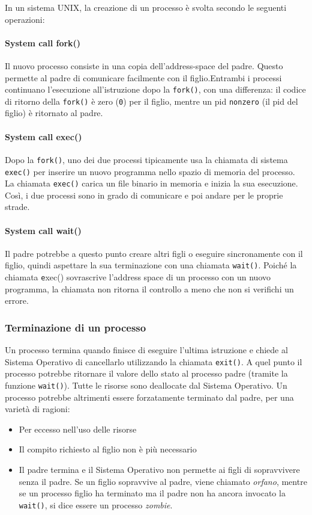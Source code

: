 \documentclass[a4paper]{article}
\begin{document}
In un sistema UNIX, la creazione di un processo è svolta secondo le seguenti operazioni:

\paragraph{System call fork()} Il nuovo processo consiste in una copia dell'address-space del padre. Questo permette al padre di comunicare facilmente con il figlio.Entrambi i processi continuano l'esecuzione all'istruzione dopo la \texttt{fork()}, con una differenza: il codice di ritorno della \texttt{fork()} è zero (\texttt{0}) per il figlio, mentre un pid \texttt{nonzero} (il pid del figlio) è ritornato al padre.
\paragraph{System call exec()} Dopo la \texttt{fork()}, uno dei due processi tipicamente usa la chiamata di sistema \texttt{exec()} per inserire un nuovo programma nello spazio di memoria del processo. La chiamata \texttt{exec()} carica un file binario in memoria e inizia la sua esecuzione. Così, i due processi sono in grado di comunicare e poi andare per le proprie strade.
\paragraph{System call wait()} Il padre potrebbe a questo punto creare altri figli o eseguire sincronamente con il figlio, quindi aspettare la sua terminazione con una chiamata \texttt{wait()}. \newline
Poiché la chiamata \texttt exec() sovrascrive l'address space di un processo con un nuovo programma, la chiamata non ritorna il controllo a meno che non si verifichi un errore.

\subsubsection{Terminazione di un processo}
Un processo termina quando finisce di eseguire l'ultima istruzione e chiede al Sistema Operativo di cancellarlo utilizzando la chiamata \texttt{exit()}. A quel punto il processo potrebbe ritornare il valore dello stato al processo padre (tramite la funzione \texttt{wait()}). Tutte le risorse sono deallocate dal Sistema Operativo. \newline
Un processo potrebbe altrimenti essere forzatamente terminato dal padre, per una varietà di ragioni:
\begin{itemize}
    \item Per eccesso nell'uso delle risorse
    \item Il compito richiesto al figlio non è più necessario
    \item Il padre termina e il Sistema Operativo non permette ai figli di sopravvivere senza il padre. Se un figlio sopravvive al padre, viene chiamato \textit{orfano}, mentre se un processo figlio ha terminato ma il padre non ha ancora invocato la \texttt{wait()}, si dice essere un processo \textit{zombie}.
\end{itemize}
\end{document}
